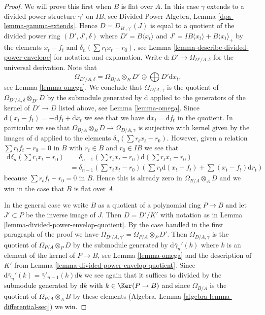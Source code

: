 \begin{proof}
We will prove this first when $B$ is flat over $A$. In this case $\gamma$
extends to a divided power structure $\gamma'$ on $IB$, see
Divided Power Algebra, Lemma \ref{dpa-lemma-gamma-extends}.
Hence $D = D_{B', \gamma'}(J)$ is equal to a quotient of
the divided power ring $(D', J', \delta)$ where $D' =  B\langle x_t \rangle$
and $J' = IB\langle x_t \rangle + B\langle x_t \rangle_{+}$
by the elements $x_t - f_t$ and $\delta_n(\sum r_t x_t - r_0)$, see
Lemma \ref{lemma-describe-divided-power-envelope} for notation
and explanation. Write $\text{d} : D' \to \Omega_{D'/A, \delta}$
for the universal derivation. Note that
$$
\Omega_{D'/A, \delta} =
\Omega_{B/A} \otimes_B D' \oplus \bigoplus D' \text{d}x_t,
$$
see Lemma \ref{lemma-omega}. We conclude that $\Omega_{D/A, \bar\gamma}$
is the quotient of $\Omega_{D'/A, \delta} \otimes_{D'} D$ by the submodule
generated by $\text{d}$ applied to the generators of the
kernel of $D' \to D$ listed above, see Lemma \ref{lemma-omega}.
Since $\text{d}(x_t - f_t) = - \text{d}f_t + \text{d}x_t$
we see that we have $\text{d}x_t = \text{d}f_t$ in the quotient.
In particular we see that $\Omega_{B/A} \otimes_B D \to \Omega_{D/A, \gamma}$
is surjective with kernel given by the images of $\text{d}$
applied to the elements $\delta_n(\sum r_t x_t - r_0)$.
However, given a relation $\sum r_tf_t - r_0 = 0$ in $B$ with
$r_t \in B$ and $r_0 \in IB$ we see that
\begin{align*}
\text{d}\delta_n(\sum r_t x_t - r_0)
& =
\delta_{n - 1}(\sum r_t x_t - r_0)\text{d}(\sum r_t x_t - r_0)
\\
& =
\delta_{n - 1}(\sum r_t x_t - r_0)
\left(
\sum r_t\text{d}(x_t - f_t) + \sum (x_t - f_t)\text{d}r_t
\right)
\end{align*}
because $\sum r_tf_t - r_0 = 0$ in $B$. Hence this is already zero in
$\Omega_{B/A} \otimes_A D$ and we win in the case that $B$ is flat over $A$.

\medskip\noindent
In the general case we write $B$ as a quotient of a polynomial ring
$P \to B$ and let $J' \subset P$ be the inverse image of $J$. Then
$D = D'/K'$ with notation as in
Lemma \ref{lemma-divided-power-envelop-quotient}.
By the case handled in the first paragraph of the proof we have
$\Omega_{D'/A, \bar\gamma'} = \Omega_{P/A} \otimes_P D'$. Then
$\Omega_{D/A, \bar \gamma}$ is the quotient of $\Omega_{P/A} \otimes_P D$
by the submodule generated by $\text{d}\bar\gamma_n'(k)$ where $k$
is an element of the kernel of $P \to B$, see
Lemma \ref{lemma-omega} and the description of $K'$ from
Lemma \ref{lemma-divided-power-envelop-quotient}. Since
$\text{d}\bar\gamma_n'(k) = \bar\gamma'_{n - 1}(k)\text{d}k$ we see
again that it suffices to divided by the submodule generated by
$\text{d}k$ with $k \in \Ker(P \to B)$ and since $\Omega_{B/A}$
is the quotient of $\Omega_{P/A} \otimes_A B$ by these elements
(Algebra, Lemma \ref{algebra-lemma-differential-seq}) we win.
\end{proof}

